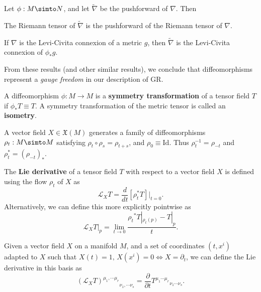 \documentclass[12pt]{article}
\begin{document}
\begin{lemma}
	Let $\phi: M \simto N$, and let $\tilde{\nabla}$ be the pushforward of $\nabla$. Then
		\begin{ronumerate}
			\item The Riemann tensor of $\tilde{\nabla}$ is the pushforward of the Riemann tensor of $\nabla$.
			\item If $\nabla$ is the Levi-Civita connexion of a metric $g$, then $\tilde{\nabla}$ is the Levi-Civita connexion of $\phi_*g$.
		\end{ronumerate}
\end{lemma}
\begin{remark}
	From these results (and other similar results), we conclude that diffeomorphisms represent a \textit{gauge freedom} in our description of GR.
\end{remark}

\begin{definition}
	A diffeomorphism $\phi: M \to M$ is a \textbf{symmetry transformation} of a tensor field $T$ if $\phi_* T \equiv T$. A symmetry transformation of the metric tensor is called an \textbf{isometry}.
\end{definition}

\begin{remark}
	A vector field $X \in \mathfrak{X}(M)$ generates a family of diffeomorphisms $\rho_t : M \simto M$ satisfying $\rho_t \circ \rho_s = \rho_{t+s}$, and $\rho_0 \equiv \text{Id}$. Thus $\rho_t^{-1} = \rho_{-t}$ and $\rho_t^* = (\rho_{-t})_*$.
\end{remark}

\begin{definition}
	The \textbf{Lie derivative} of a tensor field $T$ with respect to a vector field $X$ is defined using the flow $\rho_t$ of $X$ as
		\begin{equation}
			\mathcal{L}_X T = \frac{d}{dt}\left[ \rho_t^* T \right]|_{t=0}.
		\end{equation}
	Alternatively, we can define this more explicitly pointwise as
		\begin{equation}
			\mathcal{L}_X T|_p = \lim_{t \to 0} \frac{ 
				{\rho_t}^* T|_{\rho_t(p)} - T|_p
			}{
				t
			}.
		\end{equation}
\end{definition}

\begin{lemma}
	Given a vector field $X$ on a manifold $M$, and a set of coordinates $(t,x^i)$ adapted to $X$ such that $X(t) = 1, \, X(x^i) = 0 \Leftrightarrow X = \partial_t$, we can define the Lie derivative in this basis as
		\begin{equation}
			{\left( \mathcal{L}_X T \right)^{\mu_1, \cdots \mu_r}}_{\nu_1, \cdots \nu_s} = \frac{\partial}{\partial t} {T^{\mu_1 \cdots \mu_r}}_{\nu_1 \cdots \nu_s}.
		\end{equation}
\end{lemma}
\end{document}
